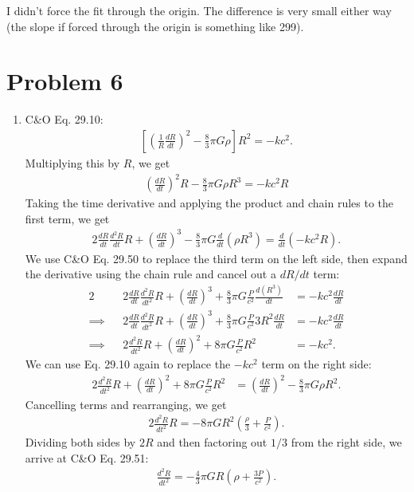 \documentclass[11pt,letterpaper]{article}
\begin{document}
I didn't force the fit through the origin. The difference is very small either way (the slope if forced through the origin is something like 299). 
\newpage

\section*{Problem 6}
\begin{enumerate}[label=(\roman*)]
    \item C\&O Eq. 29.10:
        \begin{align*}
            \left[\left(\frac{1}{R}\frac{dR}{dt}\right)^2 - \frac{8}{3}\pi G\rho\right]R^2 = -kc^2.
        \end{align*}
        Multiplying this by $R$, we get 
        \begin{align*}
            \left(\frac{dR}{dt}\right)^2 R - \frac{8}{3}\pi G\rho R^3 = -kc^2R 
        \end{align*}
        Taking the time derivative and applying the product and chain rules to the first term, we get 
        \begin{align*}
            2\frac{dR}{dt}\frac{d^2R}{dt}R + \left(\frac{dR}{dt}\right)^3 - \frac{8}{3}\pi G \frac{d}{dt}(\rho R^3) = \frac{d}{dt}(-kc^2R).
        \end{align*}
        We use C\&O Eq. 29.50 to replace the third term on the left side, then expand the derivative using the chain rule and cancel out a $dR/dt$ term:
        \begin{alignat*}{2}
            &&2\frac{dR}{dt}\frac{d^2R}{dt^2}R + \left(\frac{dR}{dt}\right)^3 + \frac{8}{3}\pi G\frac{P}{c^2}\frac{d(R^3)}{dt} &= -kc^2\frac{dR}{dt} \\
            \implies&&2\frac{dR}{dt}\frac{d^2R}{dt^2}R + \left(\frac{dR}{dt}\right)^3 + \frac{8}{3}\pi G\frac{P}{c^2}3R^2\frac{dR}{dt} &= -kc^2\frac{dR}{dt} \\
            \implies&&2\frac{d^2R}{dt^2}R + \left(\frac{dR}{dt}\right)^2 + 8\pi G\frac{P}{c^2}R^2 &= -kc^2.
        \end{alignat*}
        We can use Eq. 29.10 again to replace the $-kc^2$ term on the right side: 
        \begin{align*}
            2\frac{d^2R}{dt^2}R + \left(\frac{dR}{dt}\right)^2 + 8\pi G\frac{P}{c^2}R^2 &= \left(\frac{dR}{dt}\right)^2 - \frac{8}{3}\pi G\rho R^2.
        \end{align*}
        Cancelling terms and rearranging, we get 
        \begin{align*}
            2\frac{d^2R}{dt^2}R = -8\pi GR^2(\frac{\rho}{3} + \frac{P}{c^2}).
        \end{align*}
        Dividing both sides by $2R$ and then factoring out $1/3$ from the right side, we arrive at C\&O Eq. 29.51:
        \begin{align*}
            \frac{d^2R}{dt^2} = -\frac{4}{3}\pi GR(\rho + \frac{3P}{c^2}).
        \end{align*}


\end{enumerate}
\end{document}
